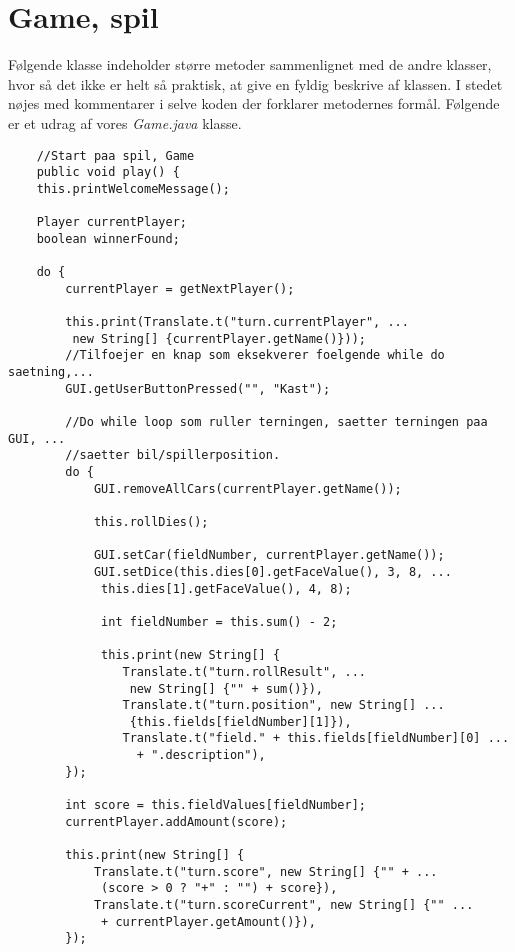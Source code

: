 \section{Game, spil}
\noindent Følgende klasse indeholder større metoder sammenlignet med de andre klasser, hvor så det ikke er helt så praktisk, at give en fyldig beskrive af klassen.
I stedet nøjes med kommentarer i selve koden der forklarer metodernes formål.
Følgende er et udrag af vores \textit{Game.java} klasse.\\
\begin{lstlisting}
    //Start paa spil, Game
    public void play() {
    this.printWelcomeMessage();

    Player currentPlayer;
    boolean winnerFound;

    do {
        currentPlayer = getNextPlayer();

        this.print(Translate.t("turn.currentPlayer", ...
         new String[] {currentPlayer.getName()}));
        //Tilfoejer en knap som eksekverer foelgende while do saetning,...
        GUI.getUserButtonPressed("", "Kast");
        
        //Do while loop som ruller terningen, saetter terningen paa GUI, ...
        //saetter bil/spillerposition.
        do {
            GUI.removeAllCars(currentPlayer.getName());

            this.rollDies();

            GUI.setCar(fieldNumber, currentPlayer.getName());
            GUI.setDice(this.dies[0].getFaceValue(), 3, 8, ...
             this.dies[1].getFaceValue(), 4, 8);

             int fieldNumber = this.sum() - 2;
             
             this.print(new String[] {
                Translate.t("turn.rollResult", ...
                 new String[] {"" + sum()}),
                Translate.t("turn.position", new String[] ...
                 {this.fields[fieldNumber][1]}),
                Translate.t("field." + this.fields[fieldNumber][0] ...
                  + ".description"),
        });

        int score = this.fieldValues[fieldNumber];
        currentPlayer.addAmount(score);

        this.print(new String[] {
            Translate.t("turn.score", new String[] {"" + ...
             (score > 0 ? "+" : "") + score}),
            Translate.t("turn.scoreCurrent", new String[] {"" ...
             + currentPlayer.getAmount()}),
        });


\end{lstlisting}
